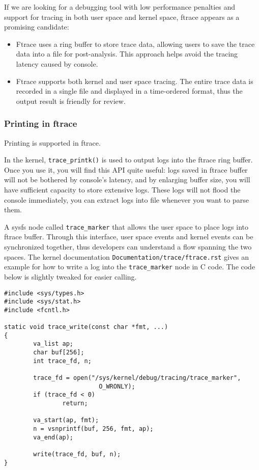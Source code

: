 \documentclass[11pt]{diazessay} %
\def\code#1{\texttt{#1}}
\begin{document}
If we are looking for a debugging tool with low performance penalties and
support for tracing in both user space and kernel space, ftrace appears as a
promising candidate:

\begin{itemize}
	\item Ftrace uses a ring buffer to store trace data, allowing users to save
the trace data into a file for post-analysis. This approach helps avoid
the tracing latency caused by console.
	\item Ftrace supports both kernel and user space tracing. The entire trace
data is recorded in a single file and displayed in a time-ordered format, thus
the output result is friendly for review.
\end{itemize}

\subsubsection*{Printing in ftrace}

Printing is supported in ftrace.

In the kernel, \code{trace\_printk()} is used to output logs into the ftrace
ring buffer. Once you use it, you will find this API quite useful: logs saved
in ftrace buffer will not be bothered by console's latency, and by
enlarging buffer size, you will have sufficient capacity to store extensive
logs. These logs will not flood the console immediately, you can extract logs
into file whenever you want to parse them.

A sysfs node called \code{trace\_marker} that allows the user space to place
logs into ftrace buffer. Through this interface, user space events and kernel
events can be synchronized together, thus developers can understand a flow
spanning the two spaces. The kernel documentation
\code{Documentation/trace/ftrace.rst} gives an example for how to write a log
into the \code{trace\_marker} node in C code. The code below is slightly
tweaked for easier calling.

\begin{lstlisting}
#include <sys/types.h>
#include <sys/stat.h>
#include <fcntl.h>

static void trace_write(const char *fmt, ...)
{
        va_list ap;
        char buf[256];
        int trace_fd, n;

        trace_fd = open("/sys/kernel/debug/tracing/trace_marker",
                          O_WRONLY);
        if (trace_fd < 0)
                return;

        va_start(ap, fmt);
        n = vsnprintf(buf, 256, fmt, ap);
        va_end(ap);

        write(trace_fd, buf, n);
}
\end{lstlisting}
\end{document}
